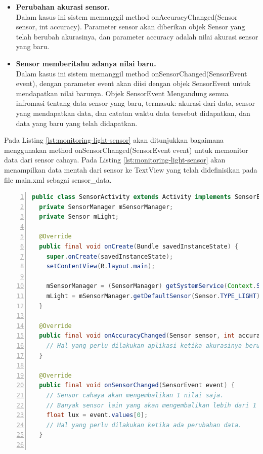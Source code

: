 \documentclass[a4paper,twoside]{article}
\begin{document}
\begin{enumerate}
\begin{itemize}
	\item \textbf{Perubahan akurasi sensor.}\\
Dalam kasus ini sistem memanggil method onAccuracyChanged(Sensor sensor, int accuracy). Parameter sensor akan diberikan objek Sensor yang telah berubah akurasinya, dan parameter accuracy adalah nilai akurasi sensor yang baru.
	\item \textbf{Sensor memberitahu adanya nilai baru.}\\
Dalam kasus ini sistem memanggil method onSensorChanged(SensorEvent event), dengan parameter event akan diisi dengan objek SensorEvent untuk mendapatkan nilai barunya. Objek SensorEvent Mengandung semua infromasi tentang data sensor yang baru, termasuk: akurasi dari data, sensor yang mendapatkan data, dan catatan waktu data tersebut didapatkan, dan data yang baru yang telah didapatkan.
\end{itemize}

Pada Listing \ref{lst:monitoring-light-sensor} akan ditunjukkan bagaimana menggunakan method onSensorChanged(SensorEvent event) untuk memonitor data dari sensor cahaya. Pada Listing \ref{lst:monitoring-light-sensor} akan menampilkan data mentah dari sensor ke TextView yang telah didefinisikan pada file main.xml sebagai sensor\_data.
\begin{lstlisting}[language=java,numbers=left,breaklines=true,caption={Contoh memonitor data mentah pada sensor cahaya},label={lst:monitoring-light-sensor},language=java]
public class SensorActivity extends Activity implements SensorEventListener {
  private SensorManager mSensorManager;
  private Sensor mLight;

  @Override
  public final void onCreate(Bundle savedInstanceState) {
    super.onCreate(savedInstanceState);
    setContentView(R.layout.main);

    mSensorManager = (SensorManager) getSystemService(Context.SENSOR_SERVICE);
    mLight = mSensorManager.getDefaultSensor(Sensor.TYPE_LIGHT);
  }

  @Override
  public final void onAccuracyChanged(Sensor sensor, int accuracy) {
    // Hal yang perlu dilakukan aplikasi ketika akurasinya berubah.
  }

  @Override
  public final void onSensorChanged(SensorEvent event) {
    // Sensor cahaya akan mengembalikan 1 nilai saja.
    // Banyak sensor lain yang akan mengembalikan lebih dari 1 nilai.
    float lux = event.values[0];
    // Hal yang perlu dilakukan ketika ada perubahan data.
  }


\end{lstlisting}
\end{enumerate}
\end{document}
